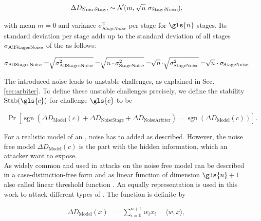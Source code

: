\begin{align}
\Delta D_{\mathrm{Noise Stage}} \sim \mathcal{N} (m,\ \sqrt[]{n}\ \sigma_{\mathrm{Stage Noise}}), \label{equ:stagenoisedistribution}
\end{align}

with mean $m = 0$ and variance $\sigma_{Stage Noise}^2$ per stage for $\gls{n}$ stages.
Its standard deviation per stage adds up to the standard deviation of all stages $\sigma_{\mathrm{All Stages Noise}}$ of the \puf as follows:

\begin{align*}
\sigma_{\mathrm{All Stages Noise}} = \sqrt[]{\sigma_{\mathrm{All Stages Noise}}^2} = \sqrt[]{n \cdot \sigma_{\mathrm{Stage Noise}}^2} = \sqrt[]{n} \cdot \sqrt[]{\sigma_{\mathrm{Stage Noise}}^2} = \sqrt[]{n} \cdot \sigma_{\mathrm{Stage Noise}}
\end{align*}

The introduced noise leads to unstable challenges, as explained in Sec. \ref{sec:arbiter}.
To define these unstable challenges precisely, we define the stability $\Stab(\gls{c})$ for challenge $\gls{c}$ to be

\begin{align}
\Pr[\operatorname{sgn}(\Delta D_{\mathrm{Model}}(c) + \Delta D_{\mathrm{Noise Stage}} + \Delta D_{\mathrm{Noise Arbiter}}) = \operatorname{sgn}(\Delta D_{\mathrm{Model}}(c))]. \label{equ:stability}
\end{align}

For a realistic model of an \apuf, noise has to added as described. 
However, the noise free model $\Delta D_{\mathrm{Model}}(c)$ is the part with the hidden information, which an attacker want to expose.\\
As widely common and used in attacks on \apuf the noise free model can be described in a case-distinction-free form and as linear function of dimension $\gls{n} + 1$ also called linear threshold function \cite{Majzoobi2008TestingSecurity, Majzoobi2008LightweightPUFs, Ruhrmair2010ModelingFunctions, Becker2015ThePUFs, Gassend2004IdentificationCircuits, Ganji2016PACPUFs}.
An equally representation is used in this work to attack different types of \apufs.
The function is definite by

\begin{align}
\Delta D_{\mathrm{Model}}(x) &= \sum_{i=0}^{n+1} w_i x_i = \langle w,x\rangle, \label{equ:pufmodelw}
\end{align}


